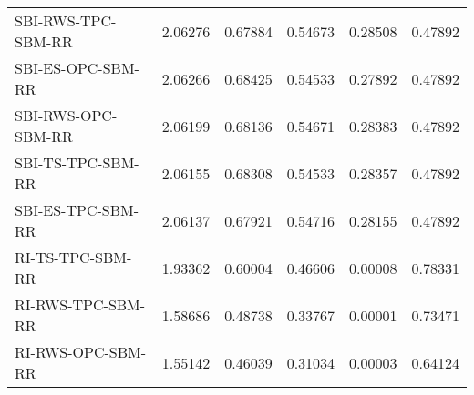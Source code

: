 \begin{tabular}{lrrrrr}
SBI-RWS-TPC-SBM-RR & 2.06276 & 0.67884 & 0.54673 & 0.28508 & 0.47892 \\
SBI-ES-OPC-SBM-RR & 2.06266 & 0.68425 & 0.54533 & 0.27892 & 0.47892 \\
SBI-RWS-OPC-SBM-RR & 2.06199 & 0.68136 & 0.54671 & 0.28383 & 0.47892 \\
SBI-TS-TPC-SBM-RR & 2.06155 & 0.68308 & 0.54533 & 0.28357 & 0.47892 \\
SBI-ES-TPC-SBM-RR & 2.06137 & 0.67921 & 0.54716 & 0.28155 & 0.47892 \\
RI-TS-TPC-SBM-RR & 1.93362 & 0.60004 & 0.46606 & 0.00008 & 0.78331 \\
RI-RWS-TPC-SBM-RR & 1.58686 & 0.48738 & 0.33767 & 0.00001 & 0.73471 \\
RI-RWS-OPC-SBM-RR & 1.55142 & 0.46039 & 0.31034 & 0.00003 & 0.64124 \\
\bottomrule
\end{tabular}
